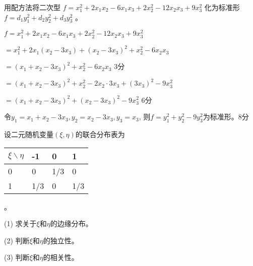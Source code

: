 \begin{question}
用配方法将二次型 $f = x_1^2 + 2 x_1 x_2 - 6 x_1 x_3 + 2 x_2^2 - 12
x_2 x_3 + 9 x^2_3$ 化为标准形 $f = d_1 y^2_1 + d_2 y^2_2 + d_3 y^2_3$ 。
\end{question}

\begin{solution}
$f = x_1^2 + 2 x_1 x_2 - 6 x_1 x_3 + 2 x_2^2 - 12 x_2 x_3 + 9 x^2_3$ \par
\qquad\qquad$= x_1^2 + 2 x_1 (x_2 - 3 x_3) + (x_2 - 3 x_3)^2 + x_2^2 - 6 x_2 x_3 $ \par
\qquad\qquad$= (x_1 + x_2 - 3 x_3)^2 + x_2^2 - 6 x_2 x_3$ \dotfill 3分 \par
\qquad\qquad$= (x_1 + x_2 - 3 x_3)^2 + x_2^2 - 2 x_2 \cdot 3 x_3 + (3 x_3)^2 - 9x_3^2$ \par
\qquad\qquad$= (x_1 + x_2 - 3 x_3)^2 + (x_2 - 3 x_3)^2 - 9 x_3^2$ \dotfill 6分\par
令$y_1 = x_1 + x_2 - 3 x_3, y_2 = x_2 - 3 x_3, y_3 = x_3$, \newline
则$f = y_1^2 + y_2^2 - 9y_3^2$为标准形。\dotfill 8分
\end{solution}


\begin{question}
设二元随机变量$(\xi, \eta)$的联合分布表为
\begin{tabular}{|l|l|l|l|}
  \hline
  $\xi \backslash \eta$ & -1 & 0 & 1\\
  \hline
  0 & 0 & 1/3 & 0\\
  \hline
  1 & 1/3 & 0 & 1/3\\
  \hline
\end{tabular}。\par
(1) 求关于$\xi$和$\eta$的边缘分布。\par
(2) 判断$\xi$和$\eta$的独立性。\par
(3) 判断$\xi$和$\eta$的相关性。
\end{question}

